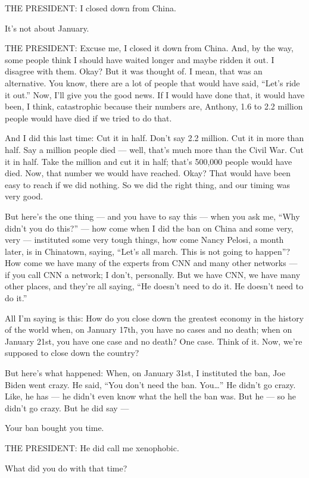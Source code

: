 THE PRESIDENT: I closed down from China.

It's not about January.

THE PRESIDENT: Excuse me, I closed it down from China. And, by the way,
some people think I should have waited longer and maybe ridden it out. I
disagree with them. Okay? But it was thought of. I mean, that was an
alternative. You know, there are a lot of people that would have said,
``Let's ride it out.'' Now, I'll give you the good news. If I would have
done that, it would have been, I think, catastrophic because their
numbers are, Anthony, 1.6 to 2.2 million people would have died if we
tried to do that.

And I did this last time: Cut it in half. Don't say 2.2 million. Cut it
in more than half. Say a million people died --- well, that's much more
than the Civil War. Cut it in half. Take the million and cut it in half;
that's 500,000 people would have died. Now, that number we would have
reached. Okay? That would have been easy to reach if we did nothing. So
we did the right thing, and our timing was very good.

But here's the one thing --- and you have to say this --- when you ask
me, ``Why didn't you do this?'' --- how come when I did the ban on China
and some very, very --- instituted some very tough things, how come
Nancy Pelosi, a month later, is in Chinatown, saying, ``Let's all march.
This is not going to happen''? How come we have many of the experts from
CNN and many other networks --- if you call CNN a network; I don't,
personally. But we have CNN, we have many other places, and they're all
saying, ``He doesn't need to do it. He doesn't need to do it.''

All I'm saying is this: How do you close down the greatest economy in
the history of the world when, on January 17th, you have no cases and no
death; when on January 21st, you have one case and no death? One case.
Think of it. Now, we're supposed to close down the country?

But here's what happened: When, on January 31st, I instituted the ban,
Joe Biden went crazy. He said, ``You don't need the ban. You\ldots{}''
He didn't go crazy. Like, he has --- he didn't even know what the hell
the ban was. But he --- so he didn't go crazy. But he did say ---

Your ban bought you time.

THE PRESIDENT: He did call me xenophobic.

What did you do with that time?

